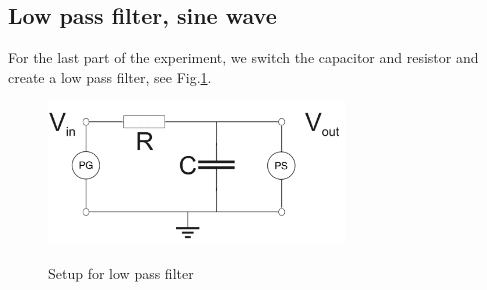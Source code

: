 \documentclass[../main/main.tex]{subfiles}
\begin{document}

\subsection{Low pass filter, sine wave}

For the last part of the experiment, we switch the capacitor and resistor and create a low pass filter, see Fig.\ref{fig:setup2}.

\begin{figure}[!ht]
  \centering
    \includegraphics[width=0.7\textwidth]{../img/setup2.png}
    \label{fig:setup2}
    \caption{Setup for low pass filter}
\end{figure}
\end{document}
